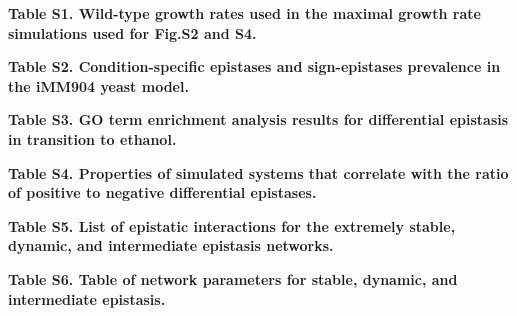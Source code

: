 \documentclass[10pt]{article}
\newcommand{\Figs}{Fig.} %
\begin{document}
\begin{description}
\item {\bf Table S1. Wild-type growth rates used in the maximal growth
rate simulations used for \Figs S2 and S4.}

\item {\bf Table S2. Condition-specific epistases and sign-epistases
prevalence in the iMM904 yeast model.}

\item {\bf Table S3. GO term enrichment analysis results for
differential epistasis in transition to ethanol.}

\item {\bf Table S4. Properties of simulated systems that correlate
with the ratio of positive to negative differential epistases.}

\item {\bf Table S5. List of epistatic interactions for the extremely
stable, dynamic, and intermediate epistasis networks.}

\item {\bf Table S6. Table of network parameters for stable, dynamic,
and intermediate epistasis.}


\end{description}
\end{document}
